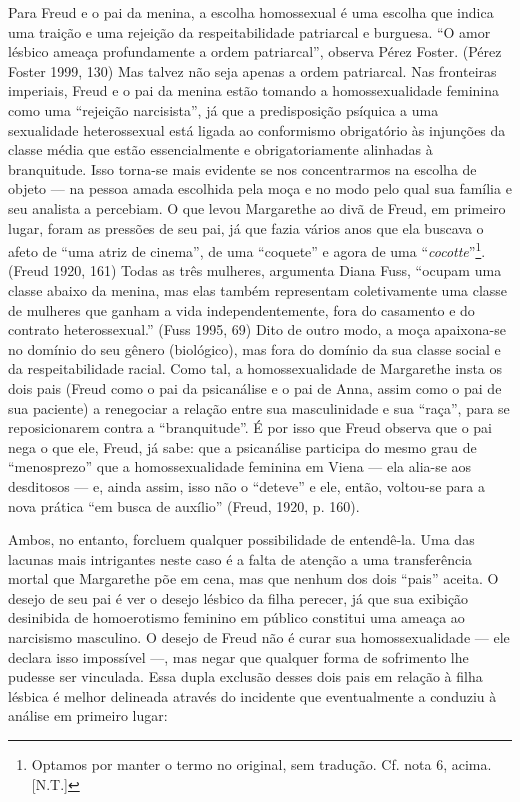 Para Freud e o pai da menina, a escolha homossexual é uma escolha que
indica uma traição e uma rejeição da respeitabilidade patriarcal e
burguesa. ``O amor lésbico ameaça profundamente a ordem patriarcal'',
observa Pérez Foster. (Pérez Foster 1999, 130) Mas talvez não seja
apenas a ordem patriarcal. Nas fronteiras imperiais, Freud e o pai da
menina estão tomando a homossexualidade feminina como uma ``rejeição
narcisista'', já que a predisposição psíquica a uma sexualidade
heterossexual está ligada ao conformismo obrigatório às injunções da
classe média que estão essencialmente e obrigatoriamente alinhadas à
branquitude. Isso torna-se mais evidente se nos concentrarmos na escolha
de objeto --- na pessoa amada escolhida pela moça e no modo pelo qual sua
família e seu analista a percebiam. O que levou Margarethe ao divã de
Freud, em primeiro lugar, foram as pressões de seu pai, já que fazia
vários anos que ela buscava o afeto de ``uma atriz de cinema'', de uma
``coquete'' e agora de uma ``\emph{cocotte}''\footnote{Optamos por manter o
  termo no original, sem tradução. Cf. nota 6, acima. {[}N.T.{]}}.
(Freud 1920, 161) Todas as três mulheres, argumenta Diana Fuss, ``ocupam
uma classe abaixo da menina, mas elas também representam coletivamente
uma classe de mulheres que ganham a vida independentemente, fora do
casamento e do contrato heterossexual.'' (Fuss 1995, 69) Dito de outro
modo, a moça apaixona-se no domínio do seu gênero (biológico), mas fora
do domínio da sua classe social e da respeitabilidade racial. Como tal,
a homossexualidade de Margarethe insta os dois pais (Freud como o pai da
psicanálise e o pai de Anna, assim como o pai de sua paciente) a
renegociar a relação entre sua masculinidade e sua ``raça'', para se
reposicionarem contra a ``branquitude''. É por isso que Freud observa que
o pai nega o que ele, Freud, já sabe: que a psicanálise participa do
mesmo grau de ``menosprezo'' que a homossexualidade feminina em Viena ---
ela alia-se aos desditosos --- e, ainda assim, isso não o ``deteve'' e
ele, então, voltou-se para a nova prática ``em busca de auxílio''
(Freud, 1920, p. 160).

Ambos, no entanto, forcluem qualquer possibilidade de entendê-la. Uma
das lacunas mais intrigantes neste caso é a falta de atenção a uma
transferência mortal que Margarethe põe em cena, mas que nenhum dos dois
``pais'' aceita. O desejo de seu pai é ver o desejo lésbico da filha
perecer, já que sua exibição desinibida de homoerotismo feminino em
público constitui uma ameaça ao narcisismo masculino. O desejo de Freud
não é curar sua homossexualidade --- ele declara isso impossível ---, mas
negar que qualquer forma de sofrimento lhe pudesse ser vinculada. Essa
dupla exclusão desses dois pais em relação à filha lésbica é melhor
delineada através do incidente que eventualmente a conduziu à análise em
primeiro lugar:

